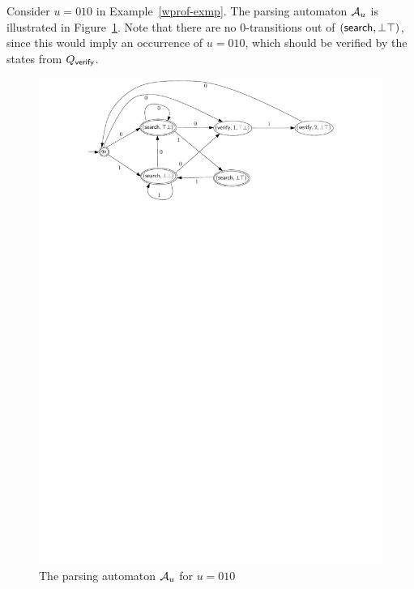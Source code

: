 \begin{example}
Consider $u=010$ in Example~\ref{wprof-exmp}. The parsing automaton  $\mathcal{A}_u$ is illustrated in Figure~\ref{fig-pa-exmp}. Note that there are no $0$-transitions out of $(\mathsf{search}, \bot\top)$, since this would imply an occurrence of $u = 010$, which should be verified by the states from $Q_{\mathsf{verify}}$.
\begin{figure}[htbp]
\begin{center}
\includegraphics[scale=0.8]{parsing-automata-example.pdf}
\end{center}
\caption{The parsing automaton $\mathcal{A}_u$ for $u = 010$}\label{fig-pa-exmp}
\end{figure}
\end{example}


